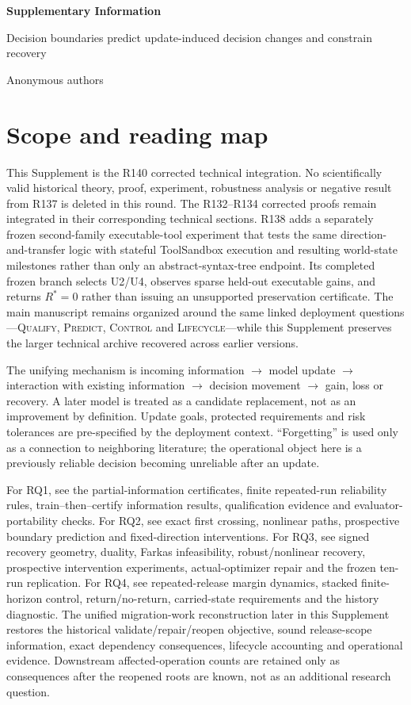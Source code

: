 \documentclass[11pt,letterpaper]{article}
\theoremstyle{plain}
\newcommand{\1}{\mathbf 1}
\begin{document}
\onehalfspacing
\begin{center}
{\LARGE\bfseries Supplementary Information\par}
\vspace{0.4em}
{\large Decision boundaries predict update-induced decision changes and constrain recovery\par}
\vspace{0.8em}Anonymous authors
\end{center}

\section*{Scope and reading map}
This Supplement is the R140 corrected technical integration. No scientifically valid historical theory, proof, experiment, robustness analysis or negative result from R137 is deleted in this round. The R132--R134 corrected proofs remain integrated in their corresponding technical sections. R138 adds a separately frozen second-family executable-tool experiment that tests the same direction-and-transfer logic with stateful ToolSandbox execution and resulting world-state milestones rather than only an abstract-syntax-tree endpoint. Its completed frozen branch selects U2/U4, observes sparse held-out executable gains, and returns $R^*=0$ rather than issuing an unsupported preservation certificate. The main manuscript remains organized around the same linked deployment questions---\textsc{Qualify}, \textsc{Predict}, \textsc{Control} and \textsc{Lifecycle}---while this Supplement preserves the larger technical archive recovered across earlier versions.

The unifying mechanism is incoming information $\rightarrow$ model update $\rightarrow$ interaction with existing information $\rightarrow$ decision movement $\rightarrow$ gain, loss or recovery. A later model is treated as a candidate replacement, not as an improvement by definition. Update goals, protected requirements and risk tolerances are pre-specified by the deployment context. ``Forgetting'' is used only as a connection to neighboring literature; the operational object here is a previously reliable decision becoming unreliable after an update.

For RQ1, see the partial-information certificates, finite repeated-run reliability rules, train--then--certify information results, qualification evidence and evaluator-portability checks. For RQ2, see exact first crossing, nonlinear paths, prospective boundary prediction and fixed-direction interventions. For RQ3, see signed recovery geometry, duality, Farkas infeasibility, robust/nonlinear recovery, prospective intervention experiments, actual-optimizer repair and the frozen ten-run replication. For RQ4, see repeated-release margin dynamics, stacked finite-horizon control, return/no-return, carried-state requirements and the history diagnostic. The unified migration-work reconstruction later in this Supplement restores the historical validate/repair/reopen objective, sound release-scope information, exact dependency consequences, lifecycle accounting and operational evidence. Downstream affected-operation counts are retained only as consequences after the reopened roots are known, not as an additional research question.
\end{document}
